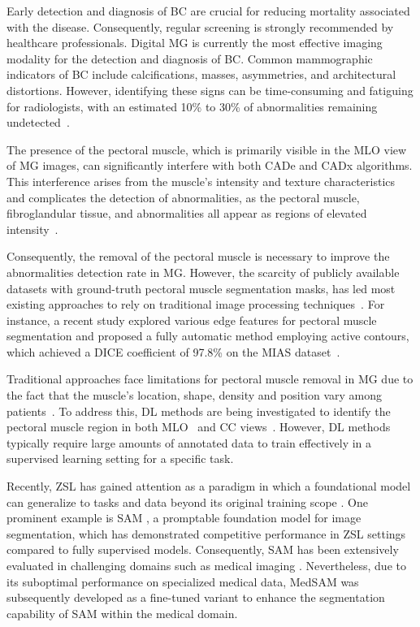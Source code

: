 \documentclass[runningheads]{llncs}
\begin{document}
Early detection and diagnosis of \ac{BC} are crucial for reducing
mortality associated with the disease. Consequently, regular screening
is strongly recommended by healthcare professionals. Digital \ac{MG}
is currently the most effective imaging modality for the detection and
diagnosis of \ac{BC}. Common mammographic indicators of \ac{BC}
include calcifications, masses, asymmetries, and architectural
distortions. However, identifying these signs can be time-consuming
and fatiguing for radiologists, with an estimated 10\% to 30\% of
abnormalities remaining undetected~\cite{Moreira2012}.
	
The presence of the pectoral muscle, which is primarily visible in the
\ac{MLO} view of \ac{MG} images, can significantly interfere with both
\ac{CADe} and \ac{CADx} algorithms. This interference arises from the
muscle's intensity and texture characteristics and complicates the
detection of abnormalities, as the pectoral muscle, fibroglandular
tissue, and abnormalities all appear as regions of elevated
intensity~\cite{Aliniya2024,Guo2020,Larroza2024}.

Consequently, the removal of the pectoral muscle is necessary to
improve the abnormalities detection rate in \ac{MG}. However, the
scarcity of publicly available datasets with ground-truth pectoral
muscle segmentation masks, has led most existing approaches to rely on
traditional image processing techniques~\cite{Aliniya2024}. For
instance, a recent study explored various edge features for pectoral
muscle segmentation and proposed a fully automatic method employing
active contours, which achieved a \ac{DICE} coefficient of 97.8\% on
the \ac{MIAS} dataset~\cite{RAMPUN201728}.

Traditional approaches face limitations for pectoral muscle removal in
\ac{MG} due to the fact that the muscle's location, shape, density and
position vary among patients~\cite{Aliniya2024}. To address this,
\ac{DL} methods are being investigated to identify the pectoral muscle
region in both \ac{MLO}~\cite{Aliniya2024Supervised,Guo2020} and
\ac{CC} views~\cite{Larroza2024}. However, \ac{DL} methods typically
require large amounts of annotated data to train effectively in a
supervised learning setting for a specific task.

Recently, \ac{ZSL} has gained attention as a paradigm in which a
foundational model can generalize to tasks and data beyond its
original training scope \cite{Kirillov2023}. One prominent example is
\ac{SAM} \cite{Kirillov2023}, a promptable foundation model for image
segmentation, which has demonstrated competitive performance in
\ac{ZSL} settings compared to fully supervised models. Consequently,
\ac{SAM} has been extensively evaluated in challenging domains such as
medical imaging \cite{Ma2024}. Nevertheless, due to its suboptimal
performance on specialized medical data, \ac{MedSAM} \cite{Ma2024} was
subsequently developed as a fine-tuned variant to enhance the
segmentation capability of \ac{SAM} within the medical domain.
\end{document}
